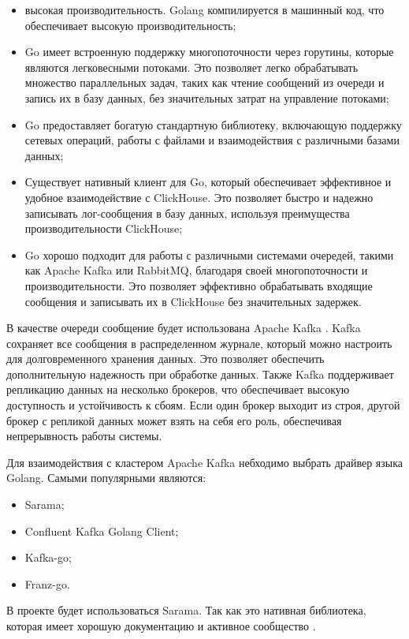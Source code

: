 \documentclass[14pt, russian]{scrartcl}
\begin{document}
\begin{itemize}
	\item высокая производительность. Golang компилируется в машинный код, что обеспечивает высокую производительность;
	\item Go имеет встроенную поддержку многопоточности через горутины, которые являются легковесными потоками. Это позволяет легко обрабатывать множество параллельных задач, таких как чтение сообщений из очереди и запись их в базу данных, без значительных затрат на управление потоками;
	\item Go предоставляет богатую стандартную библиотеку, включающую поддержку сетевых операций, работы с файлами и взаимодействия с различными базами данных;
	\item Существует нативный клиент для Go, который обеспечивает эффективное и удобное взаимодействие с ClickHouse. Это позволяет быстро и надежно записывать лог-сообщения в базу данных, используя преимущества производительности ClickHouse;
	\item Go хорошо подходит для работы с различными системами очередей, такими как Apache Kafka или RabbitMQ, благодаря своей многопоточности и производительности. Это позволяет эффективно обрабатывать входящие сообщения и записывать их в ClickHouse без значительных задержек.
\end{itemize}

В качестве очереди сообщение будет использована Apache Kafka \cite{KafkaBook}. Kafka сохраняет
все сообщения в распределенном журнале,
который можно настроить для долговременного хранения данных. Это позволяет обеспечить
дополнительную надежность при обработке данных. Также Kafka поддерживает репликацию данных на несколько брокеров,
что обеспечивает высокую доступность и устойчивость к сбоям.
Если один брокер выходит из строя, другой брокер с репликой данных может взять на себя его роль,
обеспечивая непрерывность работы системы.

Для взаимодействия с кластером Apache Kafka небходимо выбрать драйвер языка Golang.
Самыми популярными являются:

\begin{itemize}
	\item Sarama;
	\item Confluent Kafka Golang Client;
	\item Kafka-go;
	\item Franz-go.
\end{itemize}


В проекте будет использоваться Sarama. Так как
это нативная библиотека, которая имеет хорошую
документацию и активное сообщество \cite{SaramaDocs}.
\end{document}
